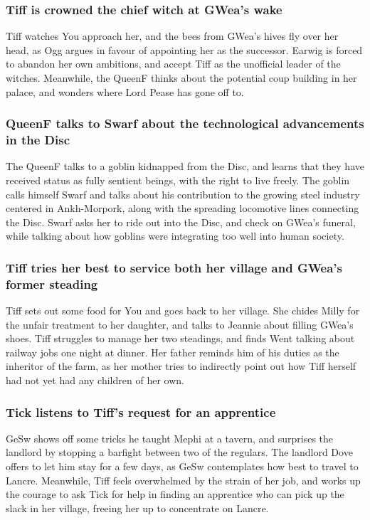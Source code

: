 \subsubsection{\Gls{Tiff} is crowned the chief witch at \Gls{GWea}'s wake}
\Gls{Tiff} watches \Gls{You} approach her, and the bees from \Gls{GWea}'s hives fly over her head,
as \Gls{Ogg} argues in favour of appointing her as the successor. \Gls{Earwig} is forced to abandon
her own ambitions, and accept \Gls{Tiff} as the unofficial leader of the witches. Meanwhile,
the \Gls{QueenF} thinks about the potential coup building in her palace, and wonders where Lord
\Gls{Pease} has gone off to.

\subsubsection{\Gls{QueenF} talks to \Gls{Swarf} about the technological advancements in the
    Disc}
The \Gls{QueenF} talks to a goblin kidnapped from the Disc, and learns that they have received
status as fully sentient beings, with the right to live freely. The goblin calls himself \Gls{Swarf}
and talks about his contribution to the growing steel industry centered in Ankh-Morpork, along with
the spreading locomotive lines connecting the Disc. \Gls{Swarf} asks her to ride out into the Disc,
and check on \Gls{GWea}'s funeral, while talking about how goblins were integrating too well into
human society.

\subsubsection{\Gls{Tiff} tries her best to service both her village and \Gls{GWea}'s former
    steading}
\Gls{Tiff} sets out some food for \Gls{You} and goes back to her village. She chides \Gls{Milly} for
the unfair treatment to her daughter, and talks to \Gls{Jeannie} about filling \Gls{GWea}'s shoes.
\Gls{Tiff} struggles to manage her two steadings, and finds \Gls{Went} talking about railway jobs
one night at dinner. Her father reminds him of his duties as the inheritor of the farm, as her
mother tries to indirectly point out how \Gls{Tiff} herself had not yet had any children of her
own.

\subsubsection{\Gls{Tick} listens to \Gls{Tiff}'s request for an apprentice}
\Gls{GeSw} shows off some tricks he taught \Gls{Mephi} at a tavern, and surprises the landlord by
stopping a barfight between two of the regulars. The landlord \Gls{Dove} offers to let him stay for
a few days, as \Gls{GeSw} contemplates how best to travel to Lancre. Meanwhile, \Gls{Tiff} feels
overwhelmed by the strain of her job, and works up the courage to ask \Gls{Tick} for help in finding
an apprentice who can pick up the slack in her village, freeing her up to concentrate on Lancre.

